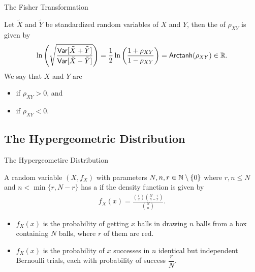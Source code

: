 \begin{frame}{The Fisher Transformation}

\justifying
{} Let $\tilde{X}$ and $\tilde{Y}$ be standardized random variables of $X$ and $Y$, then the  of $\rho_{XY}$ is given by
\begin{align*}
\ln\left(\sqrt{\frac{\mathsf{Var}[\tilde{X} + \tilde{Y}]}{\mathsf{Var}[\tilde{X} - \tilde{Y}]}} \right) = \frac{1}{2}\ln\left(\frac{1+\rho_{XY}}{1-\rho_{XY}} \right) = \mathsf{Arctanh}(\rho_{XY}) \in \mathbb{R}.
\end{align*}
We say that $X$ and $Y$ are
\begin{itemize}
	\item {} if $\rho_{XY} > 0$, and
	\item {} if $\rho_{XY} < 0$.
\end{itemize}

\end{frame}


\subsection{The Hypergeometric Distribution}

\begin{frame}{The Hypergeometirc Distribution}

\justifying
{} A random variable $(X, f_X)$ with parameters $N, n, r\in \mathbb{N}\setminus\{0\}$ where $r, n \leq N$ and $n < \min\{r, N-r\}$ has a  if the density function is given by
\begin{align*}
f_X(x) = \frac{\binom{r}{x}\binom{N-r}{n-x}}{\binom{N}{n}}.
\end{align*}
\begin{itemize}
	\justifying
	\item $f_X(x)$ is the probability of getting $x$ balls in drawing $n$ balls from a box containing $N$ balls, where $r$ of them are red.
	\item $f_X(x)$ is the probability of $x$ successes in $n$ identical but  independent Bernoulli trials, each with probability of success $\dfrac{r}{N}$.
\end{itemize}

\end{frame}


